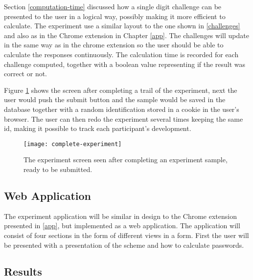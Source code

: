 \par Section \ref{computation-time} discussed how a single digit challenge can be presented to the user in a logical way, possibly making it more efficient to calculate. The experiment use a similar layout to the one shown in \autoref{challenges} and also as in the Chrome extension in Chapter \ref{app}. The challenges will update in the same way as in the chrome extension so the user should be able to calculate the responses continuously. The calculation time is recorded for each challenge computed, together with a boolean value representing if the result was correct or not. 
\par Figure \ref{complete-experiment} shows the screen after completing a trail of the experiment, next the user would push the submit button and the sample would be saved in the database together with a random identification stored in a cookie in the user's browser. The user can then redo the experiment several times keeping the same id, making it possible to track each participant's development.

\begin{figure}[h]
    \texttt{[image: complete-experiment]}
    \caption{The experiment screen seen after completing an experiment sample, ready to be submitted.}
    \label{complete-experiment}
\end{figure}

\subsection{Web Application}
The experiment application will be similar in design to the Chrome extension presented in \autoref{app}, but implemented as a web application. The application will consist of four sections in the form of different views in a form. First the user will be presented with a presentation of the scheme and how to calculate passwords.


\subsection{Results}


